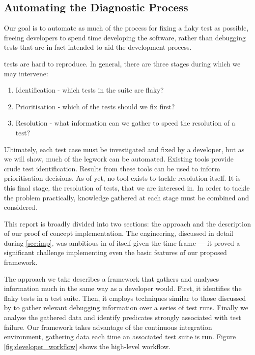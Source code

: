 \subsection{Automating the Diagnostic Process}

Our goal is to automate as much of the process for fixing a flaky test as
possible, freeing developers to spend time developing the software, rather than
debugging tests that are in fact intended to aid the development process.

\Flaky tests are hard to reproduce. In general, there are three stages during
which we may intervene:
\begin{enumerate}
	\item Identification - which tests in the suite are flaky?
	\item Prioritisation - which of the \flaky tests should we fix first?
	\item Resolution - what information can we gather to speed the resolution of a
	test?
\end{enumerate}

Ultimately, each test case must be investigated and fixed by a developer, but as
we will show, much of the legwork can be automated. Existing tools provide crude
\flaky test identification. Results from these tools can be used to inform
prioritisation decisions. As of yet, no tool exists to tackle resolution itself.
It is this final stage, the resolution of \flaky tests, that we are interesed
in. In order to tackle the problem practically, knowledge gathered at
each stage must be combined and considered.

This report is broadly divided into two sections: the approach and the
description of our proof of concept implementation. The engineering, discussed
in detail during \autoref{sec:imp}, was ambitious in of itself given the time
frame --- it proved a significant challenge implementing even the basic features
of our proposed framework.

The approach we take describes a framework that gathers and analyses information
much in the same way as a developer would. First, it identifies the flaky tests
in a test suite. Then, it employs techniques similar to those discussed by
\citet{ArumugaNainar:2010:ABI:1806799.1806839} to gather relevant debugging
information over a series of test runs. Finally we analyse the gathered data and
identify predicates strongly associated with test failure. Our framework takes
advantage of the continuous integration environment, gathering data each time an
associated test suite is run. Figure \ref{fig:developer_workflow} shows the
high-level workflow.

